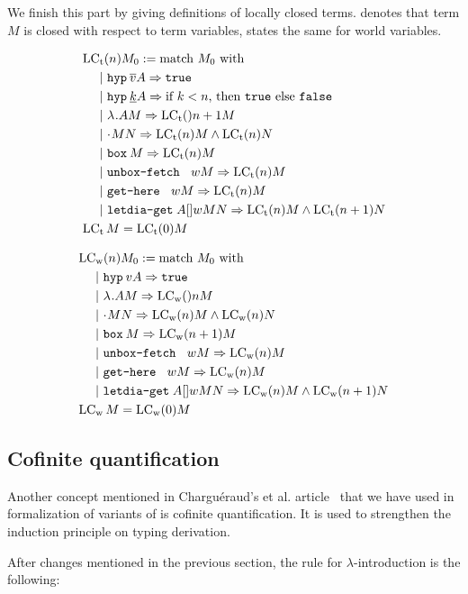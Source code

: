 We finish this part by giving definitions of locally closed terms.  denotes that term $M$ is closed with respect to term variables,  states the same for world variables.

\begin{align*}
&\lctn{n}{M_0} := \match{M_0} \\
&~~~~|~ \hyp{\fvar{v}} A => \True\\
&~~~~|~ \hyp{\bvar{k}} A => \ifthenelse{k < n}{\True}{\False}\\
&~~~~|~ \lamb A M => \lctn {n+1}{M} \\
&~~~~|~ \appl M N => \lctn{n}{M} \wedge \lctn{n}{N}\\
&~~~~|~ \bboxb {M} => \lctn{n}{M}\\
&~~~~|~ \unboxfetch w M => \lctn{n}{M}\\
&~~~~|~ \gethere w M => \lctn{n}{M}\\
&~~~~|~ \letdiagetb A w M N => \lctn{n}{M} \wedge \lctn{n+1}{N}\\
&\lct M = \lctn{0}{M}
\end{align*}

\begin{align*}
&\lcwn{n}{M_0} := \match{M_0} \\
&~~~~|~ \hyp{v} A => \True\\
&~~~~|~ \lamb A M => \lcwn {n}{M} \\
&~~~~|~ \appl M N => \lcwn{n}{M} \wedge \lcwn{n}{N}\\
&~~~~|~ \bboxb {M} => \lcwn{n+1}{M}\\
&~~~~|~ \unboxfetch w M => \lcwn{n}{M}\\
&~~~~|~ \gethere w M => \lcwn{n}{M}\\
&~~~~|~ \letdiagetb A w M N => \lcwn{n}{M} \wedge \lcwn{n+1}{N}\\
&\lcw M = \lcwn{0}{M}
\end{align*}

\subsection {Cofinite quantification}
Another concept mentioned in Chargu{\'e}raud's et al. article~\cite{charg08} that we have used in formalization of variants of \lang{} is cofinite quantification. It is used to strengthen the induction principle on typing derivation. 

After changes mentioned in the previous section, the rule for $\lambda$-introduction is the following:

